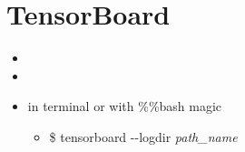 \documentclass[12pt]{article}
\begin{document}
\section{TensorBoard}

\begin{itemize}
  \item {}
  \item {}
  \item in terminal or with \%\%bash magic
  \begin{itemize}
    \item \$ tensorboard -{}-logdir \emph{path\_name}
  \end{itemize}

\end{itemize}
\end{document}
